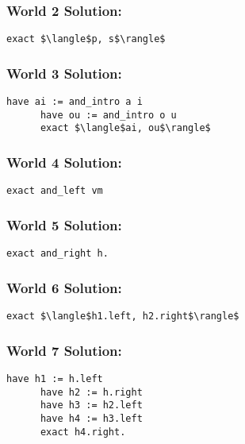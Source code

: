 \documentclass{article}
\theoremstyle{theorem}
\theoremstyle{definition}
\theoremstyle{remark}
\begin{document}
    \subsubsection*{World 2 Solution:}
    \begin{lstlisting}[mathescape=true]
      exact $\langle$p, s$\rangle$
    \end{lstlisting}

    \subsubsection*{World 3 Solution:}
    \begin{lstlisting}[mathescape=true]
      have ai := and_intro a i
      have ou := and_intro o u
      exact $\langle$ai, ou$\rangle$
    \end{lstlisting}
    
    \subsubsection*{World 4 Solution:}
    \begin{lstlisting}[mathescape=true]
      exact and_left vm
    \end{lstlisting}
    
    \subsubsection*{World 5 Solution:}
    \begin{lstlisting}[mathescape=true]
      exact and_right h.
    \end{lstlisting}
    
    \subsubsection*{World 6 Solution:}
    \begin{lstlisting}[mathescape=true]
      exact $\langle$h1.left, h2.right$\rangle$
    \end{lstlisting}
    
    \subsubsection*{World 7 Solution:}
    \begin{lstlisting}[mathescape=true]
      have h1 := h.left
      have h2 := h.right 
      have h3 := h2.left
      have h4 := h3.left
      exact h4.right.
    \end{lstlisting}
    
\end{document}
